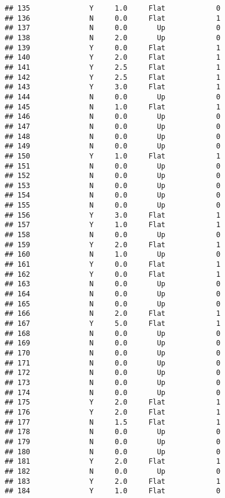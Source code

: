 \documentclass[
]{article}
\begin{document}
\begin{verbatim}
## 135              Y     1.0     Flat            0
## 136              N     0.0     Flat            1
## 137              N     0.0       Up            0
## 138              N     2.0       Up            0
## 139              Y     0.0     Flat            1
## 140              Y     2.0     Flat            1
## 141              Y     2.5     Flat            1
## 142              Y     2.5     Flat            1
## 143              Y     3.0     Flat            1
## 144              N     0.0       Up            0
## 145              N     1.0     Flat            1
## 146              N     0.0       Up            0
## 147              N     0.0       Up            0
## 148              N     0.0       Up            0
## 149              N     0.0       Up            0
## 150              Y     1.0     Flat            1
## 151              N     0.0       Up            0
## 152              N     0.0       Up            0
## 153              N     0.0       Up            0
## 154              N     0.0       Up            0
## 155              N     0.0       Up            0
## 156              Y     3.0     Flat            1
## 157              Y     1.0     Flat            1
## 158              N     0.0       Up            0
## 159              Y     2.0     Flat            1
## 160              N     1.0       Up            0
## 161              Y     0.0     Flat            1
## 162              Y     0.0     Flat            1
## 163              N     0.0       Up            0
## 164              N     0.0       Up            0
## 165              N     0.0       Up            0
## 166              N     2.0     Flat            1
## 167              Y     5.0     Flat            1
## 168              N     0.0       Up            0
## 169              N     0.0       Up            0
## 170              N     0.0       Up            0
## 171              N     0.0       Up            0
## 172              N     0.0       Up            0
## 173              N     0.0       Up            0
## 174              N     0.0       Up            0
## 175              Y     2.0     Flat            1
## 176              Y     2.0     Flat            1
## 177              N     1.5     Flat            1
## 178              N     0.0       Up            0
## 179              N     0.0       Up            0
## 180              N     0.0       Up            0
## 181              Y     2.0     Flat            1
## 182              N     0.0       Up            0
## 183              Y     2.0     Flat            1
## 184              Y     1.0     Flat            0

\end{verbatim}
\end{document}
